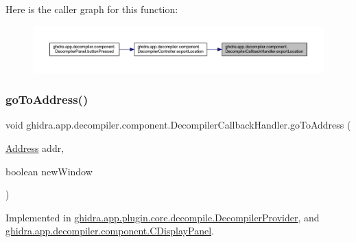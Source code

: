 Here is the caller graph for this function\+:
\nopagebreak
\begin{figure}[H]
\begin{center}
\leavevmode
\includegraphics[width=350pt]{interfaceghidra_1_1app_1_1decompiler_1_1component_1_1_decompiler_callback_handler_a94124bad6258c05b2de2fd1e9c7069b1_icgraph}
\end{center}
\end{figure}
\mbox{\label{interfaceghidra_1_1app_1_1decompiler_1_1component_1_1_decompiler_callback_handler_a83ea9c0c73ddd58a0d44de4490752a6c}} 
\subsubsection{\texorpdfstring{goToAddress()}{goToAddress()}}
{\footnotesize\ttfamily void ghidra.\+app.\+decompiler.\+component.\+Decompiler\+Callback\+Handler.\+go\+To\+Address (\begin{DoxyParamCaption}\item[{\mbox{\hyperlink{class_address}{Address}}}]{addr,  }\item[{boolean}]{new\+Window }\end{DoxyParamCaption})}



Implemented in \mbox{\hyperlink{classghidra_1_1app_1_1plugin_1_1core_1_1decompile_1_1_decompiler_provider_af9cbc00f79147db02fcb654511044e78}{ghidra.\+app.\+plugin.\+core.\+decompile.\+Decompiler\+Provider}}, and \mbox{\hyperlink{classghidra_1_1app_1_1decompiler_1_1component_1_1_c_display_panel_aff38484bccab2cb48723394fd2f83486}{ghidra.\+app.\+decompiler.\+component.\+C\+Display\+Panel}}.

\mbox{\label{interfaceghidra_1_1app_1_1decompiler_1_1component_1_1_decompiler_callback_handler_ac730fdb08d3f3ac4454d34b42cfe3d2b}} 
